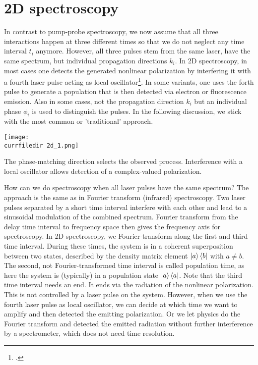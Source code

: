 \section{2D spectroscopy}


In contrast to pump-probe spectroscopy, we now assume that all three interactions happen at three different times so that we do not neglect any time interval $t_i$ anymore. However, all three pulses stem from the same laser, have the same spectrum, but individual propagation directions $k_i$. In 2D spectroscopy, in most cases one detects the generated nonlinear polarization by  interfering it with a fourth laser pulse acting as local oscillator\footcite{Ogilvie15,Scholes13}. In some variants, one uses the forth pulse to generate a population that is then detected via electron or fluorescence emission. Also in some cases, not the propagation direction $k_i$ but an individual phase $\phi_i$ is used to distinguish the pulses. In the following discussion, we stick with the most common or 'traditional' approach.

\begin{marginfigure}
\texttt{[image: \\currfiledir 2d\_1.png]}
\caption{The phase-matching direction selects the observed process. Interference with a local oscillator allows detection of a complex-valued polarization.}
\label{fig_2d_setup}
\end{marginfigure}


How can we do spectroscopy when all laser pulses have the same spectrum? The approach is the same as in Fourier transform (infrared) spectroscopy. Two laser pulses separated by a short time interval interfere with each other and lead to a sinusoidal modulation of the combined spectrum. Fourier transform from the delay time interval to frequency space then gives the frequency axis for spectroscopy. In 2D spectroscopy, we Fourier-transform along the first and third time interval. During these times, the system is in a coherent superposition between two states, described by the density matrix element $\ket{a}\bra{b}$ with $a \neq b$. The second, not Fourier-transformed time interval is called population time, as here the system is (typically) in a population state $\ket{a}\bra{a}$. Note that the third time interval needs an end. It ends via the radiation of the nonlinear polarization. This is not controlled by a laser pulse on the system. However, when we use the fourth laser pulse as local oscillator, we can decide at which  time we want to amplify and then detected the emitting polarization. Or we let physics do the Fourier transform and detected the emitted radiation without further interference by a spectrometer, which does not need time resolution.

